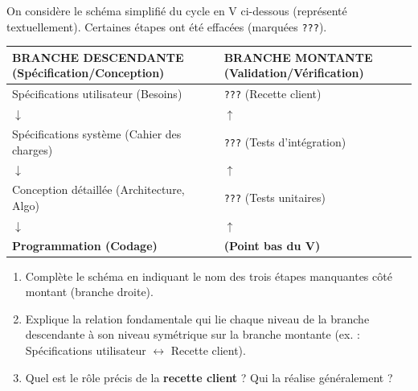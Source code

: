\documentclass[11pt]{article}
\begin{document}
\begin{exercice}
On considère le schéma simplifié du cycle en V ci-dessous (représenté textuellement). Certaines étapes ont été effacées (marquées \texttt{???}).

\begin{center}
\begin{tabular}{ll}
\textbf{BRANCHE DESCENDANTE (Spécification/Conception)} & \textbf{BRANCHE MONTANTE (Validation/Vérification)} \\
\hline
Spécifications utilisateur (Besoins) & \texttt{???} (Recette client) \\
\quad $\downarrow$ & \quad $\uparrow$ \\
Spécifications système (Cahier des charges) & \texttt{???} (Tests d'intégration) \\
\quad $\downarrow$ & \quad $\uparrow$ \\
Conception détaillée (Architecture, Algo) & \texttt{???} (Tests unitaires) \\
\quad $\downarrow$ & \quad $\uparrow$ \\
\textbf{Programmation (Codage)} & \textbf{(Point bas du V)} \\
\end{tabular}
\end{center}

\begin{enumerate}
    \item Complète le schéma en indiquant le nom des trois étapes manquantes côté montant (branche droite).
    \item Explique la relation fondamentale qui lie chaque niveau de la branche descendante à son niveau symétrique sur la branche montante (ex. : Spécifications utilisateur $\leftrightarrow$ Recette client).
    \item Quel est le rôle précis de la \textbf{recette client} ? Qui la réalise généralement ?
\end{enumerate}
\end{exercice}
\end{document}
